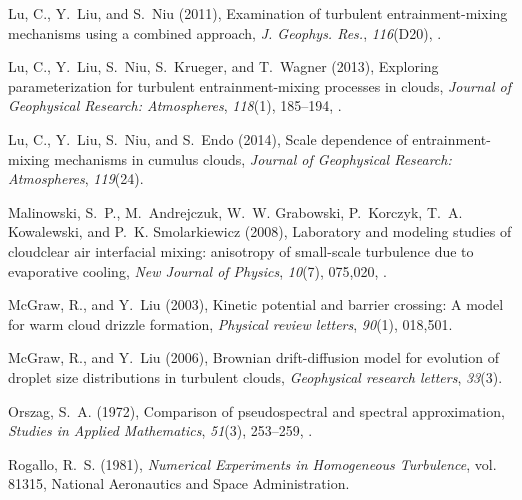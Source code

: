 \documentclass[draft,linenumbers]{agujournal}
\begin{document}
\begin{thebibliography}{60}
Lu, C., Y.~Liu, and S.~Niu (2011), Examination of turbulent entrainment-mixing
  mechanisms using a combined approach, \textit{J. Geophys. Res.},
  \textit{116}(D20), .

Lu, C., Y.~Liu, S.~Niu, S.~Krueger, and T.~Wagner (2013), Exploring
  parameterization for turbulent entrainment-mixing processes in clouds,
  \textit{Journal of Geophysical Research: Atmospheres}, \textit{118}(1),
  185--194, .

Lu, C., Y.~Liu, S.~Niu, and S.~Endo (2014), Scale dependence of
  entrainment-mixing mechanisms in cumulus clouds, \textit{Journal of
  Geophysical Research: Atmospheres}, \textit{119}(24).

Malinowski, S.~P., M.~Andrejczuk, W.~W. Grabowski, P.~Korczyk, T.~A.
  Kowalewski, and P.~K. Smolarkiewicz (2008), Laboratory and modeling studies
  of cloud{\textendash}clear air interfacial mixing: anisotropy of small-scale
  turbulence due to evaporative cooling, \textit{New Journal of Physics},
  \textit{10}(7), 075,020, .

McGraw, R., and Y.~Liu (2003), Kinetic potential and barrier crossing: A model
  for warm cloud drizzle formation, \textit{Physical review letters},
  \textit{90}(1), 018,501.

McGraw, R., and Y.~Liu (2006), Brownian drift-diffusion model for evolution of
  droplet size distributions in turbulent clouds, \textit{Geophysical research
  letters}, \textit{33}(3).

Orszag, S.~A. (1972), Comparison of pseudospectral and spectral approximation,
  \textit{Studies in Applied Mathematics}, \textit{51}(3), 253--259,
  .

Rogallo, R.~S. (1981), \textit{Numerical Experiments in Homogeneous
  Turbulence}, vol. 81315, National Aeronautics and Space Administration.


\end{thebibliography}
\end{document}
